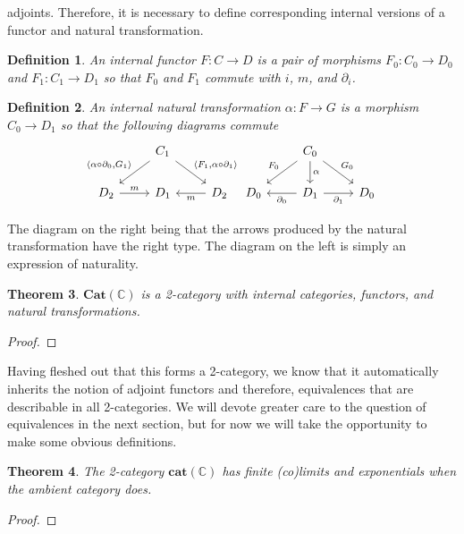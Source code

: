 \documentclass[12pt]{amsart}
\newcommand{\todo}[1]{{\color{red}{\LARGE #1}}}
\newcommand{\cat}[1]{\ensuremath{\mathbf{#1}}}
\newcommand{\Ccat}{\ensuremath{\mathbb{C}}}
\newtheorem{thm}{Theorem}[section]
\newtheorem{defn}[thm]{Definition}
\begin{document}
adjoints. Therefore, it is necessary to define corresponding internal
versions of a functor and natural transformation.
\begin{defn}\label{defn:internal:functor}
  An internal functor $F : C \to D$ is a pair of morphisms
  $F_0 : C_0 \to D_0$ and $F_1 : C_1 \to D_1$ so that $F_0$ and $F_1$
  commute with $i$, $m$, and $\partial_i$.
\end{defn}
\begin{defn}\label{defn:internal:naturaltrans}
  An internal natural transformation $\alpha : F \to G$ is a morphism
  $C_0 \to D_1$ so that the following diagrams commute
  \[
    \begin{tikzcd}
      &C_1 \ar[dl, swap, "{\langle \alpha \circ \partial_0, G_1 \rangle}"]
           \ar[dr, "{\langle F_1, \alpha \circ \partial_1 \rangle}"]&\\
      D_2 \ar[r, "m"] & D_1 & D_2 \ar[l, "m"]
    \end{tikzcd}
    \begin{tikzcd}
      &C_0 \ar[d, "\alpha"] \ar[dl, swap, "F_0"] \ar[dr, "G_0"]&\\
      D_0 & D_1 \ar[l, "\partial_0"] \ar[r, swap, "\partial_1"] & D_0
    \end{tikzcd}
  \]
\end{defn}
The diagram on the right being that the arrows produced by the
natural transformation have the right type. The diagram on the left
is simply an expression of naturality.
\begin{thm}
  $\cat{Cat}(\Ccat)$ is a 2-category with internal categories,
  functors, and natural transformations.
\end{thm}
\begin{proof}
  \todo{Probably should prove some parts of this}
\end{proof}
Having fleshed out that this forms a 2-category, we know that it
automatically inherits the notion of adjoint functors and therefore,
equivalences that are describable in all 2-categories. We will
devote greater care to the question of equivalences in the next
section, but for now we will take the opportunity to make some obvious
definitions.

\begin{thm}\label{thm:internal:2categorical}
  The 2-category $\cat{cat}(\Ccat)$ has finite (co)limits and
  exponentials when the ambient category does.
\end{thm}
\begin{proof}
  \todo{Routine proof, but should spell out}
\end{proof}
\end{document}
